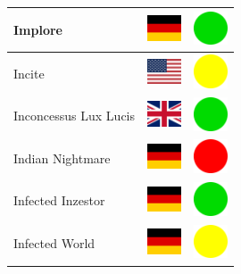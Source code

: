 \documentclass[12pt, a4paper, twoside]{report}
\begin{document}
\begin{center}
\begin{longtable}{|p{5cm}|p{2cm}|p{2cm}|}
Implore & \includegraphics[width=1cm]{4x3/de} & \includegraphics[width=1cm]{likes/y} \\ \hline
Incite & \includegraphics[width=1cm]{4x3/us} & \includegraphics[width=1cm]{likes/m} \\ \hline
Inconcessus Lux Lucis & \includegraphics[width=1cm]{4x3/gb} & \includegraphics[width=1cm]{likes/y} \\ \hline
Indian Nightmare & \includegraphics[width=1cm]{4x3/de} & \includegraphics[width=1cm]{likes/n} \\ \hline
Infected Inzestor & \includegraphics[width=1cm]{4x3/de} & \includegraphics[width=1cm]{likes/y} \\ \hline
Infected World & \includegraphics[width=1cm]{4x3/de} & \includegraphics[width=1cm]{likes/m} \\ \hline

\end{longtable}
\end{center}
\end{document}
